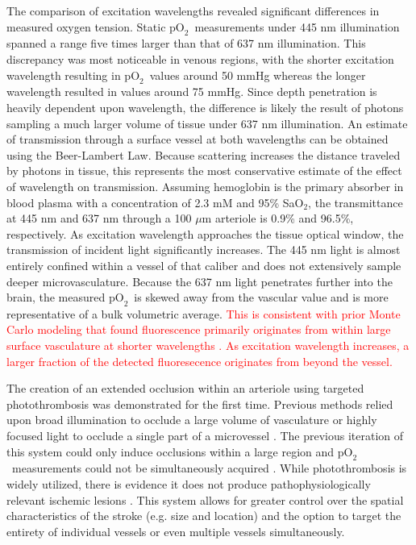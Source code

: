 \documentclass[12pt]{spieman}  %
\newcommand{\pO}{\ensuremath{\text{pO}_2}}
\begin{document}
\begin{spacing}{2}
The comparison of excitation wavelengths revealed significant differences in measured oxygen tension. Static \pO\ measurements under 445 nm illumination spanned a range five times larger than that of 637 nm illumination. This discrepancy was most noticeable in venous regions, with the shorter excitation wavelength resulting in \pO\ values around 50 mmHg whereas the longer wavelength resulted in values around 75 mmHg. Since depth penetration is heavily dependent upon wavelength\cite{Deng:2003kb}, the difference is likely the result of photons sampling a much larger volume of tissue under 637 nm illumination. An estimate of transmission through a surface vessel at both wavelengths can be obtained using the Beer-Lambert Law. Because scattering increases the distance traveled by photons in tissue, this represents the most conservative estimate of the effect of wavelength on transmission. Assuming hemoglobin is the primary absorber in blood plasma with a concentration of 2.3 mM \cite{Robles:2010cw} and 95\% SaO$_{2}$, the transmittance at 445 nm and 637 nm through a 100 $\mu$m arteriole is 0.9\% and 96.5\%, respectively. As excitation wavelength approaches the tissue optical window, the transmission of incident light significantly increases. The 445 nm light is almost entirely confined within a vessel of that caliber and does not extensively sample deeper microvasculature. Because the 637 nm light penetrates further into the brain, the measured \pO\ is skewed away from the vascular value and is more representative of a bulk volumetric average. \textcolor{red}{This is consistent with prior Monte Carlo modeling that found fluorescence primarily originates from within large surface vasculature at shorter wavelengths \cite{Davis:2011wj}. As excitation wavelength increases, a larger fraction of the detected fluoresecence originates from beyond the vessel.}

The creation of an extended occlusion within an arteriole using targeted photothrombosis was demonstrated for the first time. Previous methods relied upon broad illumination to occlude a large volume of vasculature \cite{Watson:1985bp} or highly focused light to occlude a single part of a microvessel \cite{Schaffer:2006fb}. The previous iteration of this system could only induce occlusions within a large region and \pO\ measurements could not be simultaneously acquired \cite{Ponticorvo:2010uv}. While photothrombosis is widely utilized, there is evidence it does not produce pathophysiologically relevant ischemic lesions \cite{Carmichael:2005gk}. This system allows for greater control over the spatial characteristics of the stroke (e.g. size and location) and the option to target the entirety of individual vessels or even multiple vessels simultaneously.


\end{spacing}
\end{document}
